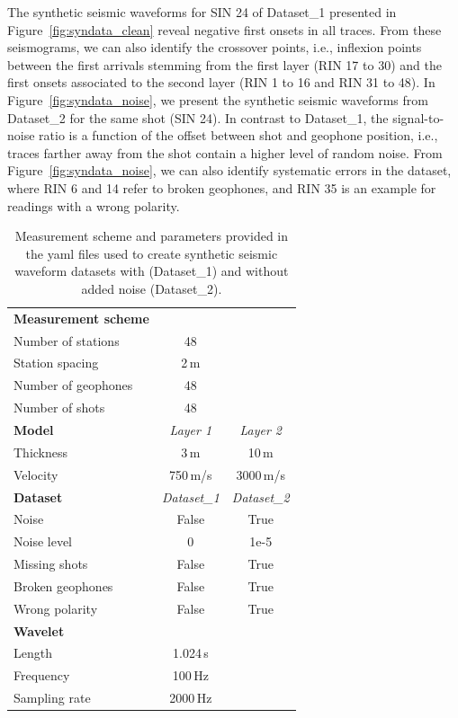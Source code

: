 \documentclass[a4paper,fleqn]{cas-sc}
\begin{document}
The synthetic seismic waveforms for SIN 24 of Dataset\_1 presented in Figure~\ref{fig:syndata_clean} reveal negative first onsets in all traces. From these seismograms, we can also identify the crossover points, i.e., inflexion points between the first arrivals stemming from the first layer (RIN 17 to 30) and the first onsets associated to the second layer (RIN 1 to 16 and RIN 31 to 48). In Figure~\ref{fig:syndata_noise}, we present the synthetic seismic waveforms from Dataset\_2 for the same shot (SIN 24). In contrast to Dataset\_1, the signal-to-noise ratio is a function of the offset between shot and geophone position, i.e., traces farther away from the shot contain a higher level of random noise. 
From Figure~\ref{fig:syndata_noise}, we can also identify systematic errors in the dataset, where RIN 6 and 14 refer to broken geophones, and RIN 35 is an example for readings with a wrong polarity.
\begin{table}[pos=h]
    \caption{Measurement scheme and parameters provided in the yaml files used to create synthetic seismic waveform datasets with (Dataset\_1) and without added noise (Dataset\_2).}
    \centering
    \begin{tabular}{lcc}
        \toprule
        \textbf{Measurement scheme} & & \\
        Number of stations & 48 & \\
        Station spacing & 2\,m & \\
        Number of geophones & 48 & \\
        Number of shots & 48 & \\
        \midrule
        \textbf{Model} & \textit{Layer 1} & \textit{Layer 2} \\
		Thickness & 3\,m & 10\,m \\
        Velocity & 750\,m/s & 3000\,m/s \\
        \midrule
        \textbf{Dataset} & \textit{Dataset\_1} & \textit{Dataset\_2} \\
		Noise & False & True \\
		Noise level & 0 & 1e-5 \\
		Missing shots & False & True \\
		Broken geophones & False & True \\
		Wrong polarity & False & True \\
		\midrule
		\textbf{Wavelet} & & \\
		Length & 1.024\,s & \\
		Frequency & 100\,Hz & \\
		Sampling rate & 2000\,Hz & \\
        \bottomrule
    \end{tabular}
    \label{tab:syndata}
\end{table}
\end{document}
